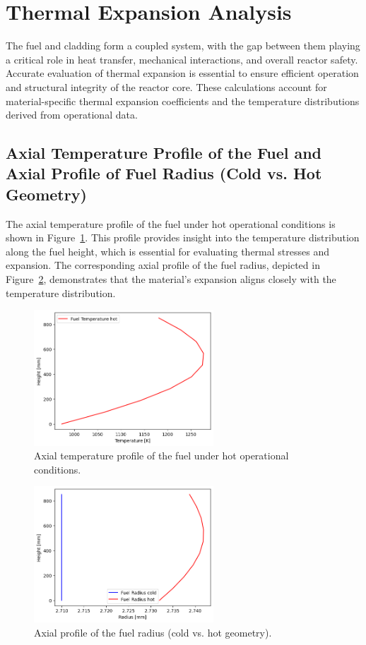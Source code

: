 \section{Thermal Expansion Analysis}

The fuel and cladding form a coupled system, with the gap between them playing a critical role in heat transfer, mechanical interactions, and overall reactor safety. Accurate evaluation of thermal expansion is essential to ensure efficient operation and structural integrity of the reactor core. These calculations account for material-specific thermal expansion coefficients and the temperature distributions derived from operational data.

\subsection{Axial Temperature Profile of the Fuel and Axial Profile of Fuel Radius (Cold vs. Hot Geometry)}

The axial temperature profile of the fuel under hot operational conditions is shown in Figure~\ref{fig:Fuel_Temperature_Hot}. This profile provides insight into the temperature distribution along the fuel height, which is essential for evaluating thermal stresses and expansion. The corresponding axial profile of the fuel radius, depicted in Figure~\ref{fig:Fuel_Radius_ColdHot}, demonstrates that the material’s expansion aligns closely with the temperature distribution.

\begin{figure}[H]
\centering
\includegraphics[width=0.6\textwidth]{1a_fuel_hot.png}
\caption{Axial temperature profile of the fuel under hot operational conditions.}
\label{fig:Fuel_Temperature_Hot}
\end{figure}

\begin{figure}[H]
\centering
\includegraphics[width=0.6\textwidth]{1b_fuel_coldhot.png}
\caption{Axial profile of the fuel radius (cold vs. hot geometry).}
\label{fig:Fuel_Radius_ColdHot}
\end{figure}

